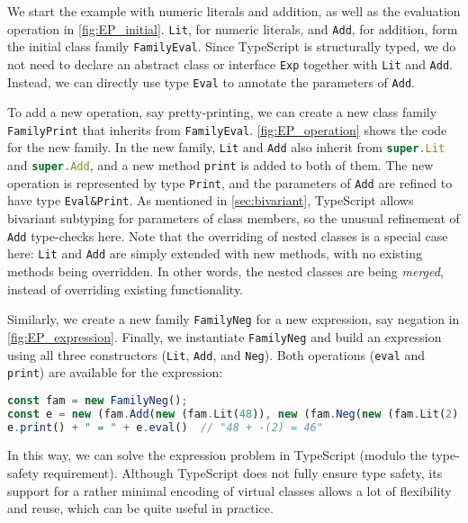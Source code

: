 We start the example with numeric literals and addition, as well as the
evaluation operation in \autoref{fig:EP_initial}. \lstinline{Lit}, for numeric
literals, and \lstinline{Add}, for addition, form the initial class family
\lstinline{FamilyEval}. Since TypeScript is structurally typed, we do not need
to declare an abstract class or interface \lstinline{Exp} together with
\lstinline{Lit} and \lstinline{Add}. Instead, we can directly use type
\lstinline{Eval} to annotate the parameters of \lstinline{Add}.

To add a new operation, say pretty-printing, we can create a new class family
\lstinline{FamilyPrint} that inherits from \lstinline{FamilyEval}.
\autoref{fig:EP_operation} shows the code for the new family. In the new family,
\lstinline{Lit} and \lstinline{Add} also inherit from
\lstinline[language=TypeScript]{super.Lit} and
\lstinline[language=TypeScript]{super.Add}, and a new method \lstinline{print}
is added to both of them. The new operation is represented by type
\lstinline{Print}, and the parameters of \lstinline{Add} are refined to have
type \lstinline{Eval&Print}. As mentioned in \autoref{sec:bivariant}, TypeScript
allows bivariant subtyping for parameters of class members, so the unusual
refinement of \lstinline{Add} type-checks here. Note that the overriding of
nested classes is a special case here: \lstinline{Lit} and \lstinline{Add} are
simply extended with new methods, with no existing methods being overridden. In
other words, the nested classes are being \emph{merged}, instead of overriding
existing functionality.

Similarly, we create a new family \lstinline{FamilyNeg} for a new expression,
say negation in \autoref{fig:EP_expression}. Finally, we instantiate
\lstinline{FamilyNeg} and build an expression using all three constructors
(\lstinline{Lit}, \lstinline{Add}, and \lstinline{Neg}). Both operations
(\lstinline{eval} and \lstinline{print}) are available for the expression:
\begin{lstlisting}[language=TypeScript]
const fam = new FamilyNeg();
const e = new (fam.Add(new (fam.Lit(48)), new (fam.Neg(new (fam.Lit(2))))));
e.print() + " = " + e.eval()  // "48 + -(2) = 46"
\end{lstlisting}
In this way, we can solve the expression problem in TypeScript (modulo the
type-safety requirement). Although TypeScript does not fully ensure type safety,
its support for a rather minimal encoding of virtual classes allows a lot of
flexibility and reuse, which can be quite useful in practice.

